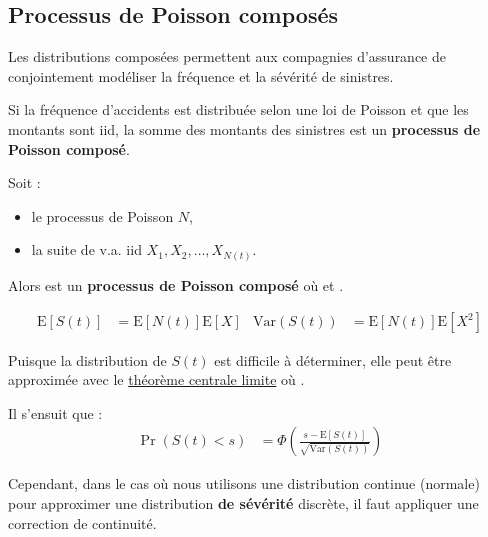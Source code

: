 \documentclass[french]{article}
\begin{document}
\begin{multicols*}{2}
\subsection{Processus de Poisson composés}
\begin{definitionNOHFILL}
\begin{rappel_enhanced}[Contexte]
Les distributions composées permettent aux compagnies d'assurance de conjointement modéliser la fréquence et la sévérité de sinistres.
\end{rappel_enhanced}
Si la fréquence d'accidents est distribuée selon une loi de Poisson et que les montants sont iid, la somme des montants des sinistres est un \textbf{processus de Poisson composé}.	

\bigskip

Soit :
\begin{itemize}
	\item	le processus de Poisson $N$,
	\item	la suite de v.a. iid $X_{1}, X_{2}, \dots, X_{N(t)}$.
\end{itemize}

Alors  est un \textbf{processus de Poisson composé} où  et .
\end{definitionNOHFILL}

\begin{definitionNOHFILLsub}
\begin{align*}
	\text{E}[S(t)]	
	&=	\text{E}[N(t)] \text{E}[X]		&
	\text{Var}(S(t))
	&=	\text{E}[N(t)] \text{E}[X^{2}]		
\end{align*}
\end{definitionNOHFILLsub}

\begin{definitionNOHFILLprop}
Puisque la distribution de $S(t)$ est difficile à déterminer, elle peut être approximée avec le \hyperlink{TCLDef}{théorème centrale limite} où .

\bigskip

Il s'ensuit que :
\begin{align*}
	\Pr(S(t) < s)
	&=	\Phi\left(\frac{s - \text{E}[S(t)]}{\sqrt{\text{Var}(S(t))}}\right)
\end{align*}

Cependant, dans le cas où nous utilisons une distribution continue (normale) pour approximer une distribution \textbf{de sévérité} discrète, il faut appliquer une correction de continuité.
\end{definitionNOHFILLprop}


\end{multicols*}
\end{document}

